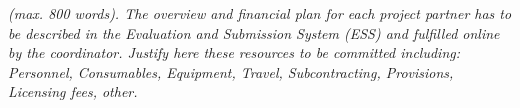 % 
%
%
%

\emph{(max. 800 words). The overview and financial plan for each project partner
  has to be described in the Evaluation and Submission System (ESS) and
  fulfilled online by the coordinator.  
Justify here these resources to be committed including: Personnel, Consumables,
Equipment, Travel, Subcontracting, Provisions, Licensing fees, other. } 




% 
